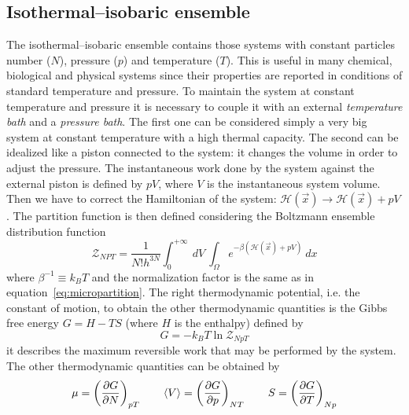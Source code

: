 \subsection{Isothermal--isobaric ensemble}
The isothermal--isobaric ensemble contains those systems with constant particles number ($N$), pressure ($p$) and
temperature ($T$). This is useful in many chemical, biological and physical systems since their properties are
reported in conditions of standard temperature and pressure. To maintain the system at constant temperature and
pressure it is necessary to couple it with an external \textit{temperature bath} and a \textit{pressure bath}.
The first one can be considered simply a very big system at constant temperature with a high thermal capacity.
The second can be idealized like a piston connected to the system: it changes the volume in order to adjust the
pressure. The instantaneous work done by the system against the external piston is defined by $pV$, where $V$ is
the instantaneous system volume. Then we have to correct the Hamiltonian of the system:
$\mathcal{H}(\vec x) \rightarrow \mathcal{H}(\vec x) + pV$. The partition function is then defined considering
the Boltzmann ensemble distribution function
\begin{equation}
	\mathcal{Z}_{NPT} = \frac{1}{N!h^{3N}}\int_0^{+\infty}\ dV \ \int_\Omega e^{-\beta(\mathcal{H}(\vec x) + pV)}\ dx
	\label{eq:nptPartition}
\end{equation}
where $\beta^{-1} \equiv k_B T$ and the normalization factor is the same as in
equation~\eqref{eq:micropartition}. The right thermodynamic potential, i.e. the constant of motion, to obtain the
other thermodynamic quantities is the Gibbs free energy $G = H - TS$ (where $H$ is the enthalpy) defined by
\begin{equation*}
	G = -k_B T\ln \mathcal{Z}_{NpT}
\end{equation*}
it describes the maximum reversible work that may be performed by the system. The other thermodynamic quantities
can be obtained by
\begin{equation*}
	\mu = \left ( \frac{\partial G}{\partial N}\right )_{pT} \qquad \left \langle V \right \rangle = \left ( \frac{\partial G}{\partial p}\right )_{NT} \qquad S = \left ( \frac{\partial G}{\partial T}\right )_{Np}
\end{equation*}

